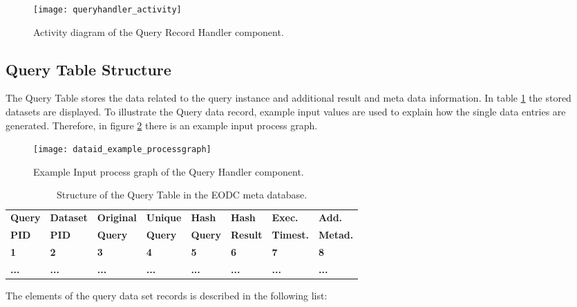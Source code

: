 \documentclass[draft,final]{vutinfth} %
\begin{document}
\begin{figure}[h]
	\centering
	\texttt{[image: queryhandler\_activity]}
	\caption{Activity diagram of the Query Record Handler component.}
	\label{fig:queryhandler_activity} %
\end{figure}

\subsection{Query Table Structure}

The Query Table stores the data related to the query instance and additional result and meta data information. In table \ref{Tab:querytable} the stored datasets are displayed. To illustrate the Query data record, example input values are used to explain how the single data entries are generated. Therefore, in figure \ref{fig:processgraph_example} there is an example input process graph.   

\begin{figure}[h]
	\centering
	\texttt{[image: dataid\_example\_processgraph]}
	\caption{Example Input process graph of the Query Handler component.}
	\label{fig:processgraph_example} %
\end{figure}

\begin{table}[]
	\caption{Structure of the Query Table in the EODC meta database.}
	\begin{tabular}{|l|l|l|l|l|l|l|l|}
	\hline	\textbf{Query} & \textbf{Dataset} & \textbf{Original} & \textbf{Unique} & \textbf{Hash} & \textbf{Hash} &
		\textbf{Exec.} & \textbf{Add.}  \\ 
		\textbf{PID} & \textbf{PID} & \textbf{Query} & \textbf{Query} & \textbf{Query} & \textbf{Result} &
		\textbf{Timest.} & \textbf{Metad.}  \\ \hline
		\textbf{1} & \textbf{2} & \textbf{3} & \textbf{4} & \textbf{5} & \textbf{6} &
		\textbf{7} & \textbf{8} \\ \hline
		\textbf{...} & \textbf{...} & \textbf{...} & \textbf{...} & \textbf{...} & \textbf{...} & \textbf{...} & \textbf{...} \\ \hline
	\end{tabular}
	\label{Tab:querytable}
\end{table}

The elements of the query data set records is described in the following list:
\end{document}
